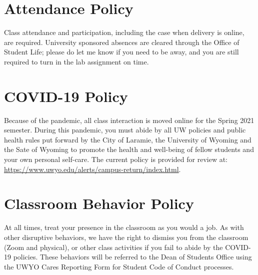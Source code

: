 \documentclass[11pt, letterpaper]{article}
\begin{document}
\section*{Attendance Policy}
Class attendance and participation, including the case when delivery is online, are required. University sponsored absences are cleared through the Office of Student Life; please do let me know if you need to be away, and you are still required to turn in the lab assignment on time.

\section*{COVID-19 Policy}
Because of the pandemic, all class interaction is moved online for the Spring 2021 semester. During this pandemic, you must abide by all UW policies and public health rules put forward by the City of Laramie, the University of Wyoming and the Sate of Wyoming to promote the health and well-being of fellow students and your own personal self-care. The current policy is provided for review at: \url{https://www.uwyo.edu/alerts/campus-return/index.html}.

\section*{Classroom Behavior Policy}
At all times, treat your presence in the classroom as you would a job. As with other disruptive behaviors, we have the right to dismiss you from the classroom (Zoom and physical), or other class activities if you fail to abide by the COVID-19 policies. These behaviors will be referred to the Dean of Students Office using the UWYO Cares Reporting Form for Student Code of Conduct processes.

\end{document}
